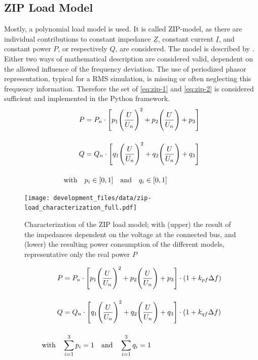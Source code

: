 \subsection{ZIP Load Model}


Mostly, a polynomial load model is used. It is called ZIP-model, as there are individual contributions to constant impedance $\underline{Z}$, constant current $\underline{I}$, and constant power $P$, or respectively $Q$, are considered. The model is described by \textcite{IEEEGuideLoad2022}. Either two ways of mathematical description are considered valid, dependent on the allowed influence of the frequency deviation. The use of periodized phasor representation, typical for a \acs{RMS} simulation, is missing or often neglecting this frequency information. Therefore the set of \autoref{eq:zip-1} and \autoref{eq:zip-2} is considered sufficient and implemented in the Python framework.
\begin{align}
        P&=P_n \cdot \Bigg[ p_1 \Bigg(\frac{U}{U_n}\Bigg)^2 + p_2 \Bigg(\frac{U}{U_n}\Bigg) + p_3 \Bigg] \label{eq:zip-1} \\[12pt]
        Q&=Q_n \cdot \Bigg[ q_1 \Bigg(\frac{U}{U_n}\Bigg)^2 + q_2 \Bigg(\frac{U}{U_n}\Bigg) + q_3 \Bigg] \label{eq:zip-2} \\[12pt]
        \text{with} \quad &p_i \in [0,1] \quad \text{and} \quad q_i \in [0,1] \notag
\end{align}


\begin{figure}[htb!]
        \centering
        \texttt{[image: development\_files/data/zip-load\_characterization\_full.pdf]}
        \caption[Characterization of the ZIP load model]{Characterization of the ZIP load model; with (upper) the result of the impedances dependent on the voltage at the connected bus, and (lower) the resulting power consumption of the different models, representative only the real power $P$}
        \label{fig:zip-charac}
\end{figure}


\begin{align}
        P&=P_n \cdot \Bigg[ p_1 \Bigg(\frac{U}{U_n}\Bigg)^2 + p_2 \Bigg(\frac{U}{U_n}\Bigg) + p_3 \Bigg] \cdot (1+k_{pf} \Delta f) \label{eq:zip-with-f-1} \\[12pt]
        Q&=Q_n \cdot \Bigg[ q_1 \Bigg(\frac{U}{U_n}\Bigg)^2 + q_2 \Bigg(\frac{U}{U_n}\Bigg) + q_3 \Bigg] \cdot (1+k_{qf} \Delta f) \label{eq:zip-with-f-2} \\[12pt]
        \text{with} \quad &\sum_{i=1}^{3} p_i =1 \quad \text{and} \quad \sum_{i=1}^{3} q_i =1 \notag
\end{align}

